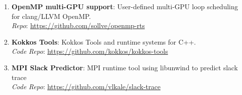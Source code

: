 \begin{enumerate}
\item \textbf{OpenMP multi-GPU support}: User-defined multi-GPU  loop scheduling for clang/LLVM OpenMP. \\ \textit{Repo}: \url{https://github.com/sollve/openmp-rts}
\item \textbf{Kokkos Tools}: Kokkos Tools and runtime systems for C++.\\ \textit{Code Repo}: \url{https://github.com/kokkos/kokkos-tools}
\item \textbf{MPI Slack Predictor}: MPI runtime tool using libunwind to predict slack trace \\ \textit{Code Repo}: \url{https://github.com/vlkale/slack-trace}
\end{enumerate}
